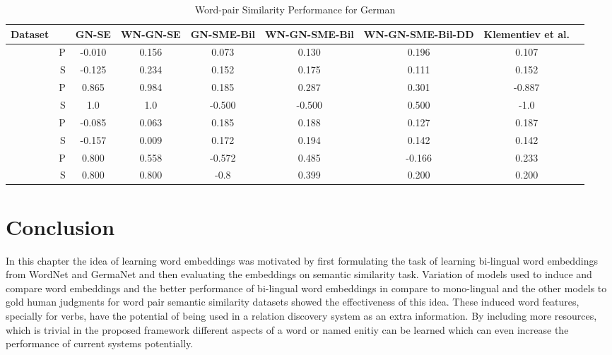 \begin{table*}[ht]
\caption{Word-pair Similarity Performance for German } %
\label{tbl:de-wp-sim}
\centering  %
\tabcolsep=0.09cm
{\footnotesize
\begin{tabular}{cr c c c c c c c} %
\hline\hline %
 Dataset & & GN-SE  & WN-GN-SE & GN-SME-Bil &  WN-GN-SME-Bil & WN-GN-SME-Bil-DD
 & Klementiev et al.
\\ [0.5ex] 
\hline %
                                 
                                 &  P & -0.010  & 0.156 & 0.073 & 0.130&0.196 &0.107 \\[-1ex]
\raisebox{1.5ex}{ZG222}  &  S & -0.125 & 0.234& 0.152 & 0.175 & 0.111 &0.152 \\[1ex]

                                  &  P & 0.865 & 0.984 & 0.185 & 0.287 & 0.301 & -0.887 \\[-1ex]
\raisebox{1.5ex}{Gur30}    &  S & 1.0   & 1.0   & -0.500 & -0.500  & 0.500 &
-1.0
\\[1ex]

                                  &  P & -0.085  & 0.063 & 0.185 & 0.188 & 0.127 &0.187 \\[-1ex]
\raisebox{1.5ex}{Gur350}  &  S & -0.157 & 0.009  &  0.172 & 0.194 & 0.142
&0.142
\\[1ex]

                                &  P & 0.800  & 0.558 & -0.572 & 0.485 & -0.166 & 0.233 \\[-1ex]
\raisebox{1.5ex}{Gur65}  &  S & 0.800 & 0.800 & -0.8 & 0.399 & 0.200 & 0.200
\\[1ex]
                                 


\hline %
     
          
 \hline %
\end{tabular}
}

\end{table*}      

\section{Conclusion}
\label{sec:ent-link-conc}
In this chapter the idea of learning word embeddings was motivated by first
formulating the task of learning bi-lingual word embeddings from WordNet and
GermaNet and then evaluating the embeddings on semantic similarity task.
Variation of models used to induce and compare word embeddings and the better
performance of bi-lingual word embeddings in compare to mono-lingual and the
other models to gold human judgments for word pair semantic similarity datasets
showed the effectiveness of this idea. These induced word features, specially
for verbs, have the potential of being used in a relation discovery system as an
extra information. By including more resources, which is trivial in the proposed
framework different aspects of a word or named enitiy can be learned which can
even increase the performance of current systems potentially. 
          